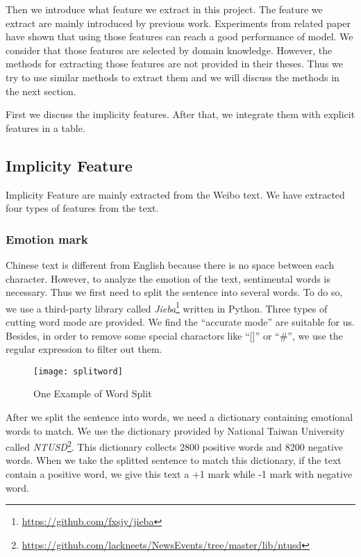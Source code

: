 Then we introduce what feature we extract in this project. The feature we extract are mainly introduced by previous work. Experiments from related paper have shown that using those features can reach a good performance of model. We consider that those features are selected by domain knowledge\cite{yu2004incorporating}. However, the methods for extracting those features are not provided in their theses. Thus we try to use similar methods to extract them and we will discuss the methods in the next section. 

First we discuss the implicity features. After that, we integrate them with explicit features in a table.

\subsection{Implicity Feature}
Implicity Feature are mainly extracted from the Weibo text. We have extracted four types of features from the text.
\subsubsection{Emotion mark}
Chinese text is different from English because there is no space between each character. However, to analyze the emotion of the text, sentimental words is necessary. Thus we first need to split the sentence into several words. To do so, we use a third-party library called \textit{Jieba}\footnote{\url{https://github.com/fxsjy/jieba}} written in Python. Three types of cutting word mode are provided. We find the ``accurate mode'' are suitable for us. Besides, in order to remove some special charactors like ``[]'' or ``\#'', we use the regular expression to filter out them.

\begin{figure}[h]\centering 
\texttt{[image: splitword]}
\caption{One Example of Word Split}\label{fig:WordSplit} 
\end{figure}

After we split the sentence into words, we need a dictionary containing emotional words to match. We use the dictionary provided by National Taiwan University called \textit{NTUSD}\footnote{\url{https://github.com/lackneets/NewsEvents/tree/master/lib/ntusd}}. This dictionary collects 2800 positive words and 8200 negative words. When we take the splitted sentence to match this dictionary, if the text contain a positive word, we give this text a +1 mark while -1 mark with negative word.

